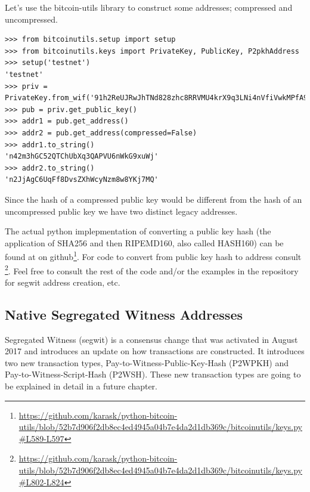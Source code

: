 Let's use the bitcoin-utils library to construct some addresses; compressed and uncompressed.

\vspace{1em}
\begin{lstlisting}[style=Python,label={lst:display-addresses},caption={Example of displaying the addresses of compressed and uncompressed public keys using Python},captionpos=b]
>>> from bitcoinutils.setup import setup
>>> from bitcoinutils.keys import PrivateKey, PublicKey, P2pkhAddress
>>> setup('testnet')
'testnet' 
>>> priv = PrivateKey.from_wif('91h2ReUJRwJhTNd828zhc8RRVMU4krX9q3LNi4nVfiVwkMPfA9p')
>>> pub = priv.get_public_key()  
>>> addr1 = pub.get_address()
>>> addr2 = pub.get_address(compressed=False)
>>> addr1.to_string()
'n42m3hGC52QTChUbXq3QAPVU6nWkG9xuWj' 
>>> addr2.to_string() 
'n2JjAgC6UqFf8DvsZXhWcyNzm8w8YKj7MQ'
\end{lstlisting}
\vspace{1em}

\begin{note}
Since the hash of a compressed public key would be different from the hash of an uncompressed public key we have two distinct legacy addresses.
\end{note}

The actual python implepmentation of converting a public key hash (the application of SHA256 and then RIPEMD160, also called HASH160) can be found at  on github\footnote{\url{https://github.com/karask/python-bitcoin-utils/blob/52b7d906f2db8ec4ed4945a04b7e4da2d1db369c/bitcoinutils/keys.py\#L589-L597}}. For code to convert from public key hash to address consult \footnote{\url{https://github.com/karask/python-bitcoin-utils/blob/52b7d906f2db8ec4ed4945a04b7e4da2d1db369c/bitcoinutils/keys.py\#L802-L824}}. Feel free to consult the rest of the code and/or the examples in the repository for segwit address creation, etc.


\subsection*{Native Segregated Witness Addresses}

Segregated Witness (segwit) is a consensus change that was activated in August 2017 and introduces an update on how transactions are constructed. It introduces two new transaction types, Pay-to-Witness-Public-Key-Hash (P2WPKH) and Pay-to-Witness-Script-Hash (P2WSH). These new transaction types are going to be explained in detail in a future chapter.

